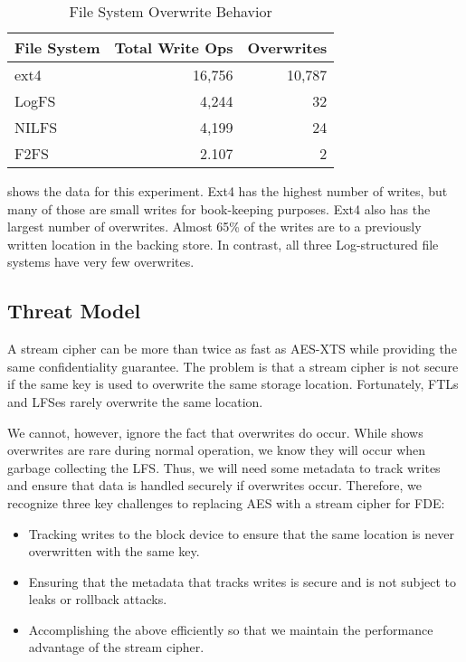 \begin{table}[th]
\caption{File System Overwrite Behavior}\label{tbl:overwrites}
\footnotesize
\centering
\begin{tabular}{lrr}
  \textbf{File System} & \textbf{Total Write Ops} & \textbf{Overwrites} \\
  \hline
  \hline
  ext4    &  16,756 & 10,787\\
  LogFS   &   4,244 &     32\\
  NILFS   &   4,199 &     24\\
  F2FS    &   2.107 &      2\\
  \hline 
  \hline
\end{tabular}
\end{table}

 shows the data for this experiment. Ext4 has the highest
number of writes, but many of those are small writes for book-keeping purposes.
Ext4 also has the largest number of overwrites. Almost 65\% of the writes are to
a previously written location in the backing store. In contrast, all three
Log-structured file systems have very few overwrites.

\subsection{Threat Model}

A stream cipher can be more than twice as fast as AES-XTS while providing the
same confidentiality guarantee. The problem is that a stream cipher is not
secure if the same key is used to overwrite the same storage location.
Fortunately, FTLs and LFSes rarely overwrite the same location.

We cannot, however, ignore the fact that overwrites do occur. While
 shows overwrites are rare during normal operation, we know
they will occur when garbage collecting the LFS. Thus, we will need some
metadata to track writes and ensure that data is handled securely if overwrites
occur. Therefore, we recognize three key challenges to replacing AES with a
stream cipher for FDE:

\begin{itemize}

\item Tracking writes to the block device to ensure that the same location is
never overwritten with the same key.

\item Ensuring that the metadata that tracks writes is secure and is not
subject to leaks or rollback attacks.

\item Accomplishing the above efficiently so that we maintain the  performance
advantage of the stream cipher.

\end{itemize}

